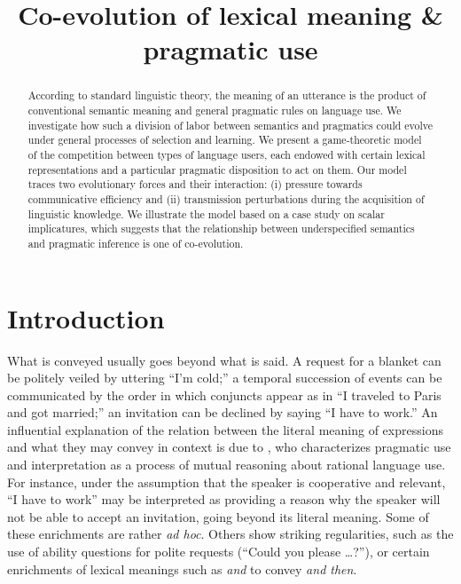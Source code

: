 \documentclass[a4paper, 11pt]{article}
\title{Co-evolution of lexical meaning \& pragmatic use}
\date{}
\theoremstyle{Satz}
\begin{document}

\maketitle

\begin{abstract}
  According to standard linguistic theory, the meaning of an utterance is the product of
  conventional semantic meaning and general pragmatic rules on language use. We investigate how
  such a division of labor between semantics and pragmatics could evolve under general
  processes of selection and learning. We present a game-theoretic model of the competition
  between types of language users, each endowed with certain lexical representations and a
  particular pragmatic disposition to act on them. Our model traces two evolutionary forces and
  their interaction: (i) pressure towards communicative efficiency and (ii) transmission
  perturbations during the acquisition of linguistic knowledge. We illustrate the model based
  on a case study on scalar implicatures, which suggests that the relationship between
  underspecified semantics and pragmatic inference is one of co-evolution.
\end{abstract}

\section{Introduction}\label{sec:introduction}

What is conveyed usually goes beyond what is said. A request for a blanket can be politely
veiled by uttering ``I'm cold;'' a temporal succession of events can be communicated by the order
in which conjuncts appear as in ``I traveled to Paris and got married;'' an invitation can be
declined by saying ``I have to work.'' An influential explanation of the relation between the
literal meaning of expressions and what they may convey in context is due to
\citet{grice:1975}, who characterizes pragmatic use and interpretation as a process of mutual
reasoning about rational language use. For instance, under the assumption that the speaker is
cooperative and relevant, ``I have to work'' may be interpreted as providing a reason why the
speaker will not be able to accept an invitation, going beyond its literal meaning. Some of
these enrichments are rather \emph{ad hoc}. Others show striking regularities, such as the use
of ability questions for polite requests (``Could you please \dots?''), or certain enrichments
of lexical meanings such as \emph{and} to convey \emph{and then}.
\end{document}
